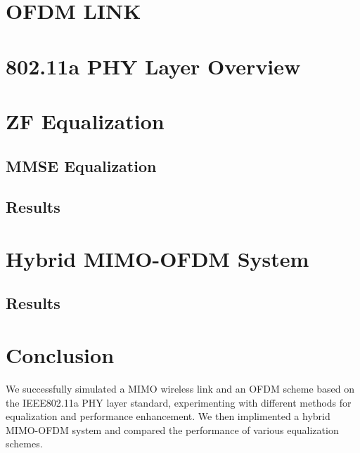 \documentclass[conference]{IEEEtran}
\begin{document}
\section{OFDM LINK}

\section{802.11a PHY Layer Overview}

\section{ZF Equalization}

\subsection{MMSE Equalization}


\subsection{Results}

\section{Hybrid MIMO-OFDM System}

\subsection{Results}

\section{Conclusion} 
We successfully simulated a MIMO wireless link and an OFDM scheme based on the IEEE802.11a PHY layer standard, experimenting with different methods for equalization and performance enhancement. We then implimented a hybrid MIMO-OFDM system and compared the performance of various equalization schemes.  



\end{document}
